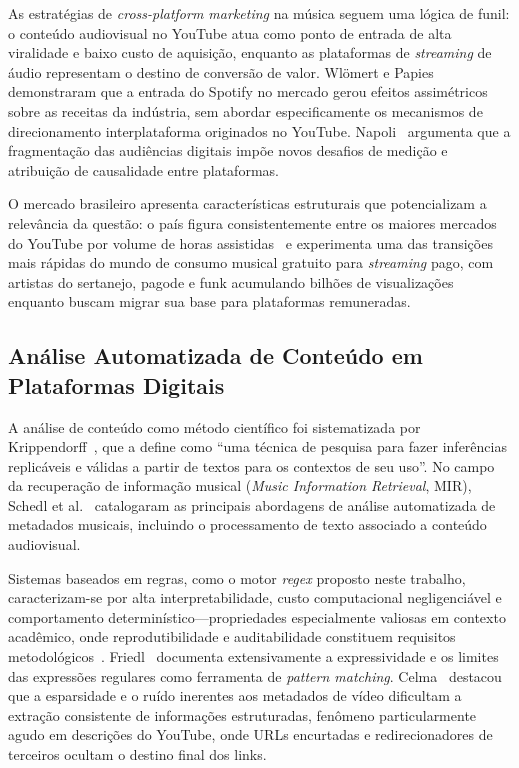 ﻿\documentclass[12pt]{article}
\begin{document}
As estratégias de \textit{cross-platform marketing} na música seguem uma
lógica de funil: o conteúdo audiovisual no YouTube atua como ponto de entrada
de alta viralidade e baixo custo de aquisição, enquanto as plataformas de
\textit{streaming} de áudio representam o destino de conversão de valor.
Wlömert e Papies~\cite{wlomert2016} demonstraram que a entrada do Spotify no
mercado gerou efeitos assimétricos sobre as receitas da indústria, sem abordar
especificamente os mecanismos de direcionamento interplataforma originados no
YouTube. Napoli~\cite{napoli2010} argumenta que a fragmentação das audiências
digitais impõe novos desafios de medição e atribuição de causalidade entre
plataformas.

O mercado brasileiro apresenta características estruturais que potencializam
a relevância da questão: o país figura consistentemente entre os maiores
mercados do YouTube por volume de horas assistidas~\cite{ifpi2023} e
experimenta uma das transições mais rápidas do mundo de consumo musical
gratuito para \textit{streaming} pago, com artistas do sertanejo, pagode e
funk acumulando bilhões de visualizações enquanto buscam migrar sua base para
plataformas remuneradas.

\subsection{Análise Automatizada de Conteúdo em Plataformas Digitais}

A análise de conteúdo como método científico foi sistematizada por
Krippendorff~\cite{krippendorff2004}, que a define como ``uma técnica de
pesquisa para fazer inferências replicáveis e válidas a partir de textos para
os contextos de seu uso''. No campo da recuperação de informação musical
(\textit{Music Information Retrieval}, MIR), Schedl et
al.~\cite{schedl2014} catalogaram as principais abordagens de análise
automatizada de metadados musicais, incluindo o processamento de texto
associado a conteúdo audiovisual.

Sistemas baseados em regras, como o motor \textit{regex} proposto neste
trabalho, caracterizam-se por alta interpretabilidade, custo computacional
negligenciável e comportamento determinístico---propriedades especialmente
valiosas em contexto acadêmico, onde reprodutibilidade e auditabilidade
constituem requisitos metodológicos~\cite{salganik2019}. Friedl~\cite{friedl2006}
documenta extensivamente a expressividade e os limites das expressões regulares
como ferramenta de \textit{pattern matching}. Celma~\cite{celma2010} destacou
que a esparsidade e o ruído inerentes aos metadados de vídeo dificultam a
extração consistente de informações estruturadas, fenômeno particularmente
agudo em descrições do YouTube, onde URLs encurtadas e redirecionadores de
terceiros ocultam o destino final dos links.
\end{document}
